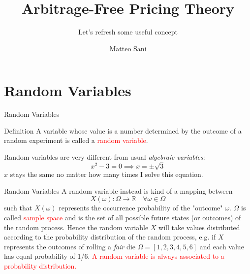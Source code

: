 \documentclass{beamer}
\title{Arbitrage-Free Pricing Theory}
\subtitle{Let's refresh some useful concept}
\author{\href{mailto:matteo.sani@unisi.it}{Matteo Sani}}
\begin{document}
	\begin{frame}[plain]
		\maketitle
	\end{frame}        

\section{Random Variables}
\begin{frame}{Random Variables}
	\begin{block}{Definition}
	A variable whose value is a number determined by the outcome of a random experiment is called a \textcolor{red}{random variable}.
	\end{block}
	\vspace{0.5 cm}
	Random variables are very different from usual \emph{algebraic variables}:
\begin{equation*}
	x^2 - 3 = 0 \implies x = \pm \sqrt{3}
\end{equation*}	
	$x$ stays the same no matter how many times I solve this equation.
\end{frame}

\begin{frame}{Random Variables}
	A random variable instead is kind of a mapping between 
	\begin{equation*}
		X(\omega):\Omega\rightarrow \mathbb{R}\quad \forall\omega\in\Omega
	\end{equation*}
	such that $X(\omega)$ represents the occurrence probability of the "outcome" $\omega$. $\Omega$ is called \textcolor{red}{sample space} and is the set of all possible future states (or outcomes) of the random process.
	\vspace{0.5cm}        
	Hence the random variable $X$ will take values distributed according to the probability distribution of the random process, e.g. if $X$ represents the outcomes of rolling a \emph{fair} die $\Omega = [1,2,3,4,5,6]$ and each value has equal probability of 1/6.
	\vspace{0.5cm}
	\textcolor{red}{A random variable is always associated to a probability distribution.}
\end{frame}
\end{document}
